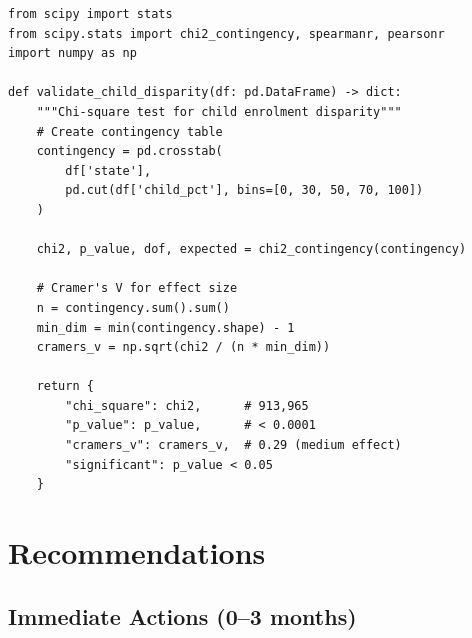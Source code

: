 \documentclass[12pt,a4paper]{article}
\begin{document}
\begin{lstlisting}[caption={Statistical Validation Code using SciPy 1.12}]
from scipy import stats
from scipy.stats import chi2_contingency, spearmanr, pearsonr
import numpy as np

def validate_child_disparity(df: pd.DataFrame) -> dict:
    """Chi-square test for child enrolment disparity"""
    # Create contingency table
    contingency = pd.crosstab(
        df['state'], 
        pd.cut(df['child_pct'], bins=[0, 30, 50, 70, 100])
    )
    
    chi2, p_value, dof, expected = chi2_contingency(contingency)
    
    # Cramer's V for effect size
    n = contingency.sum().sum()
    min_dim = min(contingency.shape) - 1
    cramers_v = np.sqrt(chi2 / (n * min_dim))
    
    return {
        "chi_square": chi2,      # 913,965
        "p_value": p_value,      # < 0.0001
        "cramers_v": cramers_v,  # 0.29 (medium effect)
        "significant": p_value < 0.05
    }
\end{lstlisting}

\newpage

\section{Recommendations}

\subsection{Immediate Actions (0--3 months)}
\end{document}
